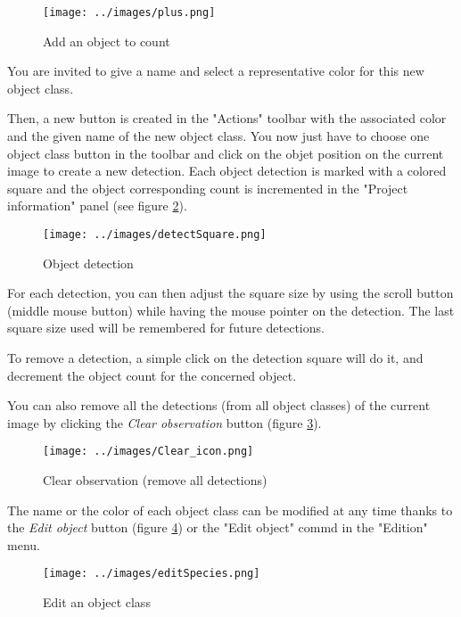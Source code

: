 \documentclass{article}
\begin{document}
\begin{figure}[!h]
  \centering
  \texttt{[image: ../images/plus.png]}
  \caption{\label{fig:AddObject} Add an object to count }
\end{figure}

You are invited to give a name and select a representative color for this new object class. 

Then, a new button is created in the "Actions" toolbar with the associated color and the given name of the new object class. You now just have to choose one object class button in the toolbar and click on the objet position on the current image to create a new detection. Each object detection is marked with a colored square and the object corresponding count is incremented in the "Project information" panel (see figure \ref{fig:ObjectDetection}). 

\begin{figure}[!h]
  \centering
  \texttt{[image: ../images/detectSquare.png]}
  \caption{\label{fig:ObjectDetection} Object detection}
\end{figure}

For each detection, you can then adjust the square size by using the scroll button (middle mouse button) while having the mouse pointer on the detection. The last square size used will be remembered for future detections. 

To remove a detection, a simple click on the detection square will do it, and decrement the object count for the concerned object. 

You can also remove all the detections (from all object classes) of the current image by clicking the \emph{Clear observation} button (figure \ref{fig:ClearObservation}). 

\begin{figure}[!h]
  \centering
  \texttt{[image: ../images/Clear\_icon.png]}
  \caption{\label{fig:ClearObservation} Clear observation (remove all detections) }
\end{figure}

The name or the color of each object class can be modified at any time thanks to the \emph{Edit object} button (figure \ref{fig:EditObject}) or the "Edit object" commd in the "Edition" menu.
\begin{figure}[!h]
  \centering
  \texttt{[image: ../images/editSpecies.png]}
  \caption{\label{fig:EditObject} Edit an object class }
\end{figure}
\end{document}
